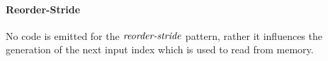%

\paragraph{Reorder-Stride}
No code is emitted for the $\text{\textit{reorder-stride}}$ pattern, rather it influences the generation of the next input index which is used to read from memory.

